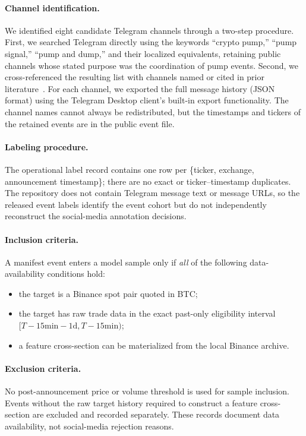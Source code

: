 \documentclass{ieeeaccess}
\begin{document}
\paragraph{Channel identification.}
We identified eight candidate Telegram channels through a two-step procedure. First, we searched Telegram directly using the keywords ``crypto pump,'' ``pump signal,'' ``pump and dump,'' and their localized equivalents, retaining public channels whose stated purpose was the coordination of pump events. Second, we cross-referenced the resulting list with channels named or cited in prior literature~\cite{la_morgia_pump_2020, pd_anatomy, econometrics11030022}. For each channel, we exported the full message history (JSON format) using the Telegram Desktop client's built-in export functionality. The channel names cannot always be redistributed, but the timestamps and tickers of the retained events are in the public event file.

\paragraph{Labeling procedure.}
The operational label record contains one row per \{ticker, exchange, announcement timestamp\}; there are no exact or ticker--timestamp duplicates. The repository does not contain Telegram message text or message URLs, so the released event labels identify the event cohort but do not independently reconstruct the social-media annotation decisions.

\paragraph{Inclusion criteria.}
A manifest event enters a model sample only if \emph{all} of the following data-availability conditions hold:
\begin{itemize}
    \item the target is a Binance spot pair quoted in BTC;
    \item the target has raw trade data in the exact past-only eligibility interval $[T-15\text{min}-1\text{d},T-15\text{min})$;
    \item a feature cross-section can be materialized from the local Binance archive.
\end{itemize}

\paragraph{Exclusion criteria.}
No post-announcement price or volume threshold is used for sample inclusion. Events without the raw target history required to construct a feature cross-section are excluded and recorded separately. These records document data availability, not social-media rejection reasons.
\end{document}
